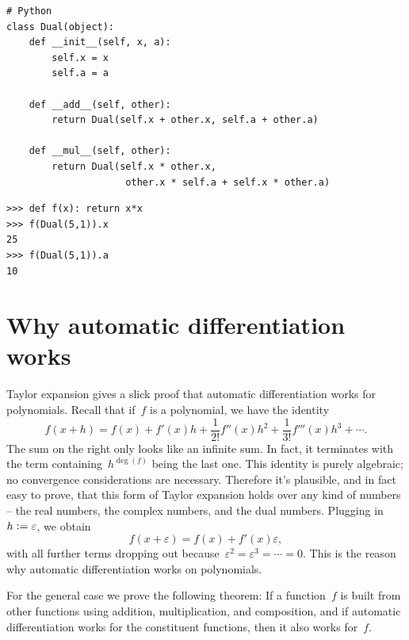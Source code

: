 \documentclass[a4paper,ngerman,12pt]{scrartcl}
\theoremstyle{definition}
\theoremstyle{plain}
\theoremstyle{remark}
\newcommand{\defeq}{\vcentcolon=}
\begin{document}
\begin{verbatim}
# Python
class Dual(object):
    def __init__(self, x, a):
        self.x = x
        self.a = a

    def __add__(self, other):
        return Dual(self.x + other.x, self.a + other.a)

    def __mul__(self, other):
        return Dual(self.x * other.x,
                     other.x * self.a + self.x * other.a)
\end{verbatim}

\begin{verbatim}>>> def f(x): return x*x
>>> f(Dual(5,1)).x
25
>>> f(Dual(5,1)).a
10
\end{verbatim}


\section{Why automatic differentiation works}

Taylor expansion gives a slick proof that automatic differentiation works for
polynomials. Recall that if~$f$ is a polynomial, we have the identity
\[ f(x+h) = f(x) + f'(x) h + \frac{1}{2!} f''(x) h^2 + \frac{1}{3!} f'''(x) h^3
+ \cdots. \]
The sum on the right only looks like an infinite sum. In fact, it terminates
with the term containing~$h^{\deg(f)}$ being the last one. This identity is
purely algebraic; no convergence considerations are necessary. Therefore it's
plausible, and in fact easy to prove, that this form of Taylor expansion holds
over any kind of numbers -- the real numbers, the complex numbers, and the dual
numbers. Plugging in~$h \defeq \varepsilon$, we obtain
\[ f(x+\varepsilon) = f(x) + f'(x) \varepsilon, \]
with all further terms dropping out because~$\varepsilon^2 = \varepsilon^3 =
\cdots = 0$. This is the reason why automatic differentiation works on
polynomials.

For the general case we prove the following theorem: If a function~$f$ is built
from other functions using addition, multiplication, and composition, and if
automatic differentiation works for the constituent functions, then it also
works for~$f$.
\end{document}
